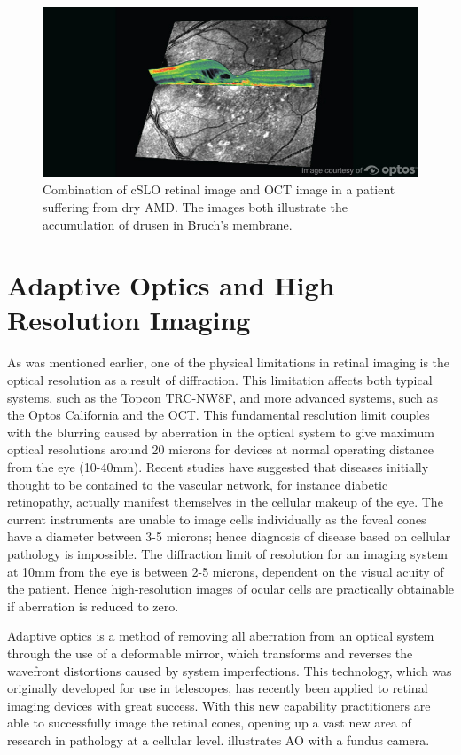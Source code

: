 \begin{figure}[htbp]
\centering
\includegraphics{figures/multi}
\caption{Combination of cSLO retinal image and OCT image in a patient suffering from
dry AMD. The images both illustrate the accumulation of drusen in Bruch’s membrane.}
\label{fig:multi}
\end{figure}

\section{Adaptive Optics and High Resolution Imaging}


As was mentioned earlier, one of the physical limitations in retinal imaging is
the optical resolution as a result of diffraction. This limitation affects both
typical systems, such as the Topcon TRC-NW8F, and more advanced systems, such as
the Optos California and the OCT. This fundamental resolution limit couples with
the blurring caused by aberration in the optical system to give maximum optical
resolutions around 20 microns for devices at normal operating distance from the
eye (10-40mm). Recent studies \cite{barber2003new} have suggested that diseases
initially thought to be contained to the vascular network, for instance diabetic
retinopathy, actually manifest themselves in the cellular makeup of the eye. The
current instruments are unable to image cells individually as the foveal cones
have a diameter between 3-5 microns; hence diagnosis of disease based on cellular
pathology is impossible. The diffraction limit of resolution for an imaging system
at 10mm from the eye is between 2-5 microns, dependent on the visual acuity of the
patient. Hence high-resolution images of ocular cells are practically obtainable
if aberration is reduced to zero.
 
Adaptive optics is a method of removing all aberration from an optical system
through the use of a deformable mirror, which transforms and reverses the wavefront
distortions caused by system imperfections. This technology, which was originally
developed for use in telescopes, has recently been applied to retinal imaging
devices with great success. \cite{zhang2006high} With this new capability
practitioners are able to successfully image the retinal cones, opening up a vast
new area of research in pathology at a cellular level.  illustrates
AO with a fundus camera.

